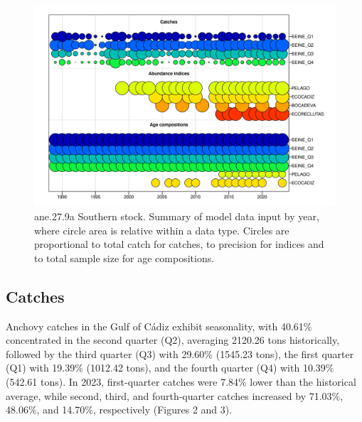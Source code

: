 \documentclass[
]{article}
\begin{document}
\begin{figure}[H]

{\centering \includegraphics[width=0.95\linewidth]{report/run/S1.0_4FLEETS_SelECO_RecIndex_Mnewfix/fig_input_data} 

}

\caption{ane.27.9a Southern stock. Summary of model data input by year, where circle area is relative within a data type. Circles are proportional to total catch for catches, to precision for indices and to total sample size for age compositions.}\label{fig:unnamed-chunk-2}
\end{figure}

\hypertarget{catches}{%
\subsection{Catches}\label{catches}}

Anchovy catches in the Gulf of Cádiz exhibit seasonality, with 40.61\%
concentrated in the second quarter (Q2), averaging 2120.26 tons
historically, followed by the third quarter (Q3) with 29.60\% (1545.23
tons), the first quarter (Q1) with 19.39\% (1012.42 tons), and the
fourth quarter (Q4) with 10.39\% (542.61 tons). In 2023, first-quarter
catches were 7.84\% lower than the historical average, while second,
third, and fourth-quarter catches increased by 71.03\%, 48.06\%, and
14.70\%, respectively (Figures 2 and 3).
\end{document}

